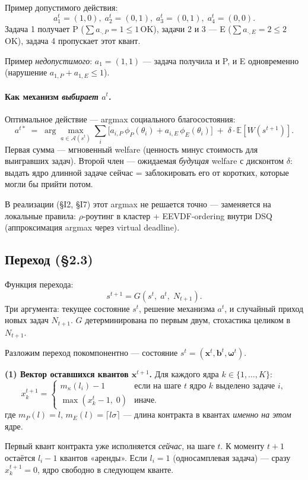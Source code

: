 \documentclass[11pt,a4paper]{article}
\begin{document}
Пример допустимого действия:
\[
a_1^t=(1,0),\; a_2^t=(0,1),\; a_3^t=(0,1),\; a_4^t=(0,0).
\]
Задача 1 получает P ($\sum a_{\cdot,P}=1\leq 1$\,OK), задачи 2 и 3 —
E ($\sum a_{\cdot,E}=2\leq 2$\,OK), задача 4 пропускает этот квант.

Пример \emph{недопустимого}: $a_1=(1,1)$ — задача получила и P, и E
одновременно (нарушение $a_{1,P}+a_{1,E}\leq 1$).

\paragraph{Как механизм \emph{выбирает} $a^t$.}
Оптимальное действие — argmax социального благосостояния:
\[
a^{t*} \;=\; \arg\max_{a\in\mathcal{A}(s^t)}
\sum_i \bigl[a_{i,P}\,\phi_P(\theta_i) + a_{i,E}\,\phi_E(\theta_i)\bigr]
\;+\; \delta\cdot\mathbb{E}[W(s^{t+1})].
\]
Первая сумма — мгновенный welfare (ценность минус стоимость для
выигравших задач). Второй член — ожидаемая \emph{будущая} welfare с
дисконтом $\delta$: выдать ядро длинной задаче сейчас = заблокировать
его от коротких, которые могли бы прийти потом.

В реализации (§I2, §I7) этот argmax не решается точно — заменяется
на локальные правила: $\rho$-роутинг в кластер + EEVDF-ordering
внутри DSQ (аппроксимация argmax через virtual deadline).

\subsection{Переход (§2.3)}

Функция перехода:
\[
s^{t+1} = G(s^t,\; a^t,\; N_{t+1}).
\]
Три аргумента: текущее состояние $s^t$, решение механизма $a^t$, и
случайный приход новых задач $N_{t+1}$. $G$ детерминирована по первым
двум, стохастика целиком в $N_{t+1}$.

Разложим переход покомпонентно — состояние $s^t=(\mathbf{x}^t,\mathbf{b}^t,\boldsymbol\omega^t)$.

\textbf{(1) Вектор оставшихся квантов $\mathbf{x}^{t+1}$.} Для каждого
ядра $k\in\{1,\ldots,K\}$:
\[
x_k^{t+1} =
\begin{cases}
m_\kappa(l_i) - 1 & \text{если на шаге } t \text{ ядро } k \text{ выделено задаче } i,\\
\max(x_k^t - 1,\; 0) & \text{иначе.}
\end{cases}
\]
где $m_P(l)=l$, $m_E(l)=\lceil l\sigma\rceil$ — длина контракта в
квантах \emph{именно на этом} ядре.

\begin{why}
Первый квант контракта уже исполняется \emph{сейчас}, на шаге $t$.
К моменту $t+1$ остаётся $l_i-1$ квантов «аренды». Если $l_i=1$
(односамплевая задача) — сразу $x_k^{t+1}=0$, ядро свободно в
следующем кванте.
\end{why}
\end{document}
